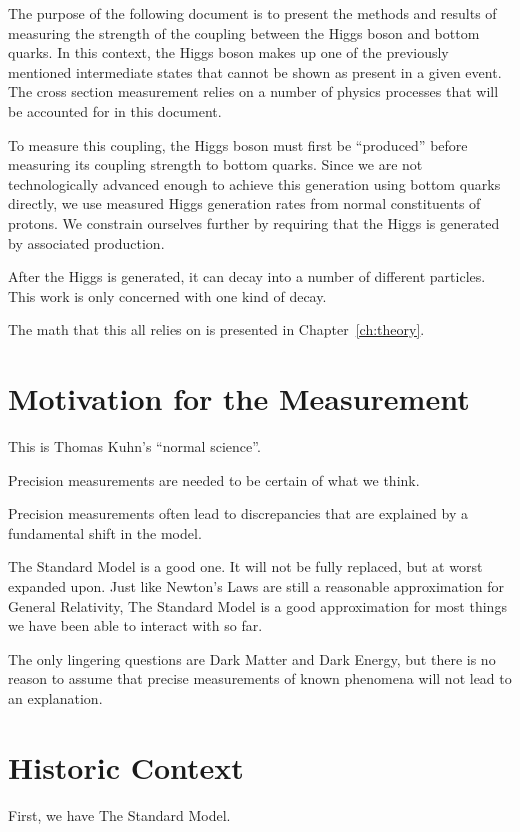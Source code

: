 The purpose of the following document is to present the methods and results of measuring the strength of the coupling between the Higgs boson and bottom quarks.
In this context, the Higgs boson makes up one of the previously mentioned intermediate states that cannot be shown as present in a given event.
The cross section measurement relies on a number of physics processes that will be accounted for in this document.

To measure this coupling, the Higgs boson must first be ``produced'' before measuring its coupling strength to bottom quarks.
Since we are not technologically advanced enough to achieve this generation using bottom quarks directly,
we use measured Higgs generation rates from normal constituents of protons.
We constrain ourselves further by requiring that the Higgs is generated by associated production.

After the Higgs is generated, it can decay into a number of different particles.
This work is only concerned with one kind of decay.

The math that this all relies on is presented in Chapter~\ref{ch:theory}.

\section{Motivation for the Measurement}

This is Thomas Kuhn's ``normal science''.

Precision measurements are needed to be certain of what we think.

Precision measurements often lead to discrepancies that are explained by a fundamental shift in the model.

The Standard Model is a good one.
It will not be fully replaced, but at worst expanded upon.
Just like Newton's Laws are still a reasonable approximation for General Relativity, The Standard Model is a good approximation for most things we have been able to interact with so far.

The only lingering questions are Dark Matter and Dark Energy,
but there is no reason to assume that precise measurements of known phenomena will not lead to an explanation.

\section{Historic Context}

First, we have The Standard Model.

